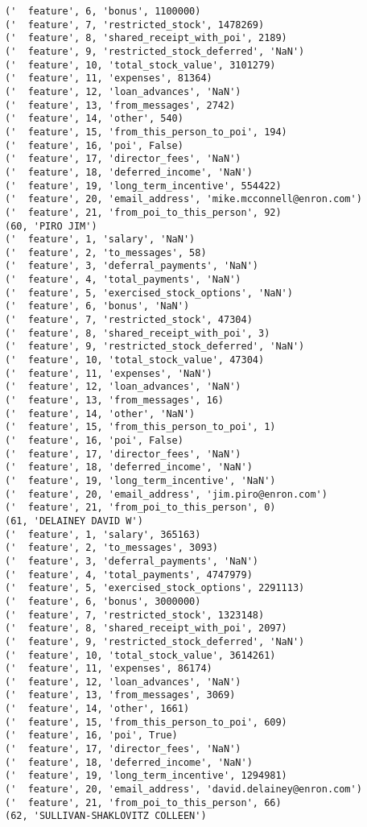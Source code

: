 \begin{verbatim}
('  feature', 6, 'bonus', 1100000)
('  feature', 7, 'restricted_stock', 1478269)
('  feature', 8, 'shared_receipt_with_poi', 2189)
('  feature', 9, 'restricted_stock_deferred', 'NaN')
('  feature', 10, 'total_stock_value', 3101279)
('  feature', 11, 'expenses', 81364)
('  feature', 12, 'loan_advances', 'NaN')
('  feature', 13, 'from_messages', 2742)
('  feature', 14, 'other', 540)
('  feature', 15, 'from_this_person_to_poi', 194)
('  feature', 16, 'poi', False)
('  feature', 17, 'director_fees', 'NaN')
('  feature', 18, 'deferred_income', 'NaN')
('  feature', 19, 'long_term_incentive', 554422)
('  feature', 20, 'email_address', 'mike.mcconnell@enron.com')
('  feature', 21, 'from_poi_to_this_person', 92)
(60, 'PIRO JIM')
('  feature', 1, 'salary', 'NaN')
('  feature', 2, 'to_messages', 58)
('  feature', 3, 'deferral_payments', 'NaN')
('  feature', 4, 'total_payments', 'NaN')
('  feature', 5, 'exercised_stock_options', 'NaN')
('  feature', 6, 'bonus', 'NaN')
('  feature', 7, 'restricted_stock', 47304)
('  feature', 8, 'shared_receipt_with_poi', 3)
('  feature', 9, 'restricted_stock_deferred', 'NaN')
('  feature', 10, 'total_stock_value', 47304)
('  feature', 11, 'expenses', 'NaN')
('  feature', 12, 'loan_advances', 'NaN')
('  feature', 13, 'from_messages', 16)
('  feature', 14, 'other', 'NaN')
('  feature', 15, 'from_this_person_to_poi', 1)
('  feature', 16, 'poi', False)
('  feature', 17, 'director_fees', 'NaN')
('  feature', 18, 'deferred_income', 'NaN')
('  feature', 19, 'long_term_incentive', 'NaN')
('  feature', 20, 'email_address', 'jim.piro@enron.com')
('  feature', 21, 'from_poi_to_this_person', 0)
(61, 'DELAINEY DAVID W')
('  feature', 1, 'salary', 365163)
('  feature', 2, 'to_messages', 3093)
('  feature', 3, 'deferral_payments', 'NaN')
('  feature', 4, 'total_payments', 4747979)
('  feature', 5, 'exercised_stock_options', 2291113)
('  feature', 6, 'bonus', 3000000)
('  feature', 7, 'restricted_stock', 1323148)
('  feature', 8, 'shared_receipt_with_poi', 2097)
('  feature', 9, 'restricted_stock_deferred', 'NaN')
('  feature', 10, 'total_stock_value', 3614261)
('  feature', 11, 'expenses', 86174)
('  feature', 12, 'loan_advances', 'NaN')
('  feature', 13, 'from_messages', 3069)
('  feature', 14, 'other', 1661)
('  feature', 15, 'from_this_person_to_poi', 609)
('  feature', 16, 'poi', True)
('  feature', 17, 'director_fees', 'NaN')
('  feature', 18, 'deferred_income', 'NaN')
('  feature', 19, 'long_term_incentive', 1294981)
('  feature', 20, 'email_address', 'david.delainey@enron.com')
('  feature', 21, 'from_poi_to_this_person', 66)
(62, 'SULLIVAN-SHAKLOVITZ COLLEEN')

\end{verbatim}
